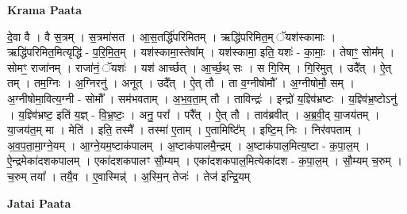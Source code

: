 \documentclass[17pt]{extarticle}
\begin{document}
\textbf{Krama Paata} \newline

दे॒वा वै । वै स॒त्रम् । स॒त्रमा॑सत । आ॒स॒तर्द्धि॑परिमितम् । ऋद्धि॑परिमित॒म् ॅयश॑स्कामाः । ऋद्धि॑परिमित॒मित्यृद्धि॑ - प॒रि॒मि॒त॒म् । यश॑स्कामा॒स्तेषा᳚म् । यश॑स्कामा॒ इति॒ यशः॑ - का॒माः॒ । तेषाꣳ॒॒ सोम᳚म् । सोमꣳ॒॒ राजा॑नम् । राजा॑नं॒ ॅयशः॑ । यश॑ आर्च्छत् । आ॒र्च्छ॒थ् सः । स गि॒रिम् । गि॒रिमुत् । उदै᳚त् । ऐ॒त् तम् । तम॒ग्निः । अ॒ग्निरनु॑ । अनूत् । उदै᳚त् । ऐ॒त् तौ । ता व॒ग्नीषोमौ᳚ । अ॒ग्नीषोमौ॒ सम् । अ॒ग्नीषोमा॒वित्य॒ग्नी - सोमौ᳚ । सम॑भवताम् । अ॒भ॒व॒ता॒म् तौ । ताविन्द्रः॑ । इन्द्रो॑ य॒ज्ञ्वि॑भ्रष्टः । य॒ज्ञ्वि॑भ्र॒ष्टोऽनु॑ । य॒ज्ञ्वि॑भ्रष्ट॒ इति॑ य॒ज्ञ् - वि॒भ्र॒ष्टः॒ । अनु॒ परा᳚ । परै᳚त् । ऐ॒त् तौ । ताव॑ब्रवीत् । अ॒ब्र॒वी॒द् या॒जय॑तम् । या॒जय॑त॒म् मा । मेति॑ । इति॒ तस्मै᳚ । तस्मा॑ ए॒ताम् । ए॒तामिष्टि᳚म् । इष्टि॒म् निः । निर॑वपताम् । अ॒व॒प॒ता॒मा॒ग्ने॒यम् । आ॒ग्ने॒यम॒ष्टाक॑पालम् । अ॒ष्टाक॑पालमै॒न्द्रम् । अ॒ष्टाक॑पाल॒मित्य॒ष्टा - क॒पा॒ल॒म् । ऐ॒न्द्रमेका॑दशकपालम् । एका॑दशकपालꣳ सौ॒म्यम् । एका॑दशकपाल॒मित्येका॑दश - क॒पा॒ल॒म् । सौ॒म्यम् च॒रुम् । च॒रुम् तया᳚ । तयै॒व । ए॒वास्मिन्न्॑ । अ॒स्मि॒न् तेजः॑ । तेज॑ इन्द्रि॒यम् \newline

\textbf{Jatai Paata} \newline
\end{document}
